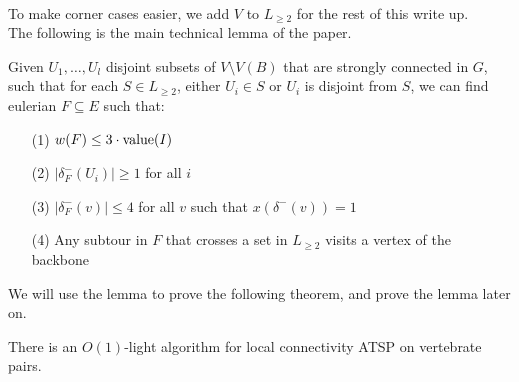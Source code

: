 \documentclass[./main.tex]{subfiles}
\begin{document}
	\\To make corner cases easier, we add $V$ to $L_{\geq 2}$ for the rest of this write up.\vspace{2mm}
	\\The following is the main technical lemma of the paper. \vspace{1mm}
	\begin{lemma}\label{lemma7}
		Given $U_1,\ldots,U_l$ disjoint subsets of $V\setminus V(B)$ that are strongly connected in $G$, such that for each $S\in L_{\geq 2}$, either $U_i\in S$ or $U_i$ is disjoint from $S$, we can find eulerian $F\subseteq E$ such that:
		\begin{enumerate}
			\item[(1)] $w(F)\leq 3\cdot \textup{value}(I)$
			\item[(2)] $|\delta^-_F(U_i)|\geq 1$ for all $i$
			\item[(3)] $|\delta^-_F(v)|\leq 4$ for all $v$ such that $x(\delta^-(v)) = 1$
			\item[(4)] Any subtour in $F$ that crosses a set in $L_{\geq 2}$ visits a vertex of the backbone
		\end{enumerate}
	\end{lemma}\vspace{2mm}
	We will use the lemma to prove the following theorem, and prove the lemma later on.\vspace{2mm}\pagebreak[2]
	\begin{theorem}
		There is an $O(1)$-light algorithm for local connectivity ATSP on vertebrate pairs.
	\end{theorem}
\end{document}
